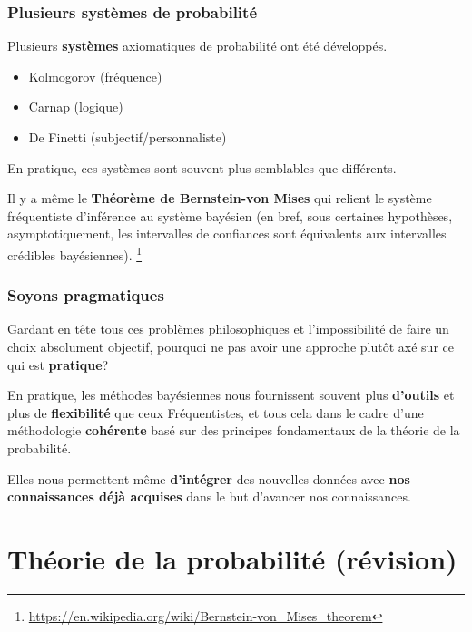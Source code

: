 \documentclass{beamer}
\begin{document}
\begin{frame}
    \frametitle{Plusieurs systèmes de probabilité}
    Plusieurs \textbf{systèmes} axiomatiques de probabilité ont été développés.

    \begin{itemize}
      \item Kolmogorov (fréquence)
      \item Carnap (logique)
      \item De Finetti (subjectif/personnaliste)
    \end{itemize}

    \pause

    \vfill

    En pratique, ces systèmes sont souvent plus semblables que différents.

    \pause

    \vfill

    Il y a même le \textbf{Théorème de Bernstein-von Mises} qui relient le système fréquentiste
    d’inférence au système bayésien (en bref, sous certaines hypothèses, asymptotiquement,
    les intervalles de confiances sont équivalents aux intervalles crédibles bayésiennes).
    \footnote{
      \url{https://en.wikipedia.org/wiki/Bernstein-von_Mises_theorem}
    }
\end{frame}


\begin{frame}
    \frametitle{Soyons pragmatiques}
    Gardant en tête tous ces problèmes philosophiques et l’impossibilité de faire un choix absolument objectif,
    pourquoi ne pas avoir une approche plutôt axé sur ce qui est \textbf{pratique}?

    \pause

    \vfill

    En pratique, les méthodes bayésiennes nous fournissent souvent plus \textbf{d’outils} et plus de
    \textbf{flexibilité} que ceux Fréquentistes, et tous cela dans le cadre d’une méthodologie \textbf{cohérente}
    basé sur des principes fondamentaux de la théorie de la probabilité.

    \pause
    
    \vfill

    Elles nous permettent même \textbf{d’intégrer} des nouvelles données avec \textbf{nos connaissances déjà acquises} 
    dans le but d’avancer nos connaissances.
\end{frame}


\section{Théorie de la probabilité (révision)}
\end{document}

